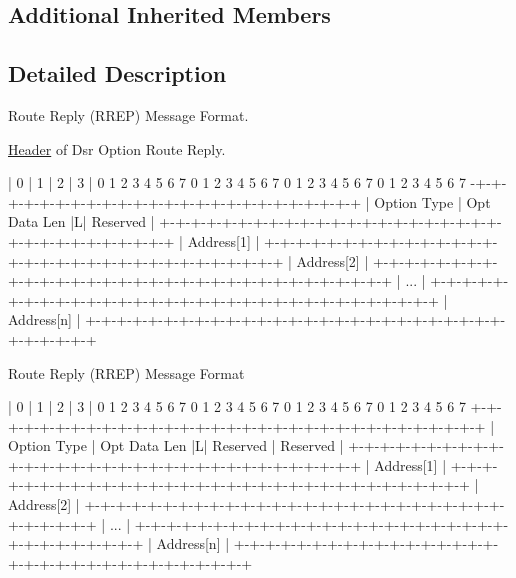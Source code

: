 \subsection*{Additional Inherited Members}


\subsection{Detailed Description}
Route Reply (R\+R\+EP) Message Format. 

\hyperlink{classns3_1_1Header}{Header} of Dsr Option Route Reply.

\begin{DoxyVerb} |      0        |      1        |      2        |      3        |
 0 1 2 3 4 5 6 7 0 1 2 3 4 5 6 7 0 1 2 3 4 5 6 7 0 1 2 3 4 5 6 7
                -+-+-+-+-+-+-+-+-+-+-+-+-+-+-+-+-+-+-+-+-+-+-+-+-+
                |  Option Type  |  Opt Data Len |L|   Reserved   |
 +-+-+-+-+-+-+-+-+-+-+-+-+-+-+-+-+-+-+-+-+-+-+-+-+-+-+-+-+-+-+-+-+
 |                            Address[1]                         |
 +-+-+-+-+-+-+-+-+-+-+-+-+-+-+-+-+-+-+-+-+-+-+-+-+-+-+-+-+-+-+-+-+
 |                            Address[2]                         |
 +-+-+-+-+-+-+-+-+-+-+-+-+-+-+-+-+-+-+-+-+-+-+-+-+-+-+-+-+-+-+-+-+
 |                               ...                             |
 +-+-+-+-+-+-+-+-+-+-+-+-+-+-+-+-+-+-+-+-+-+-+-+-+-+-+-+-+-+-+-+-+
 |                            Address[n]                         |
 +-+-+-+-+-+-+-+-+-+-+-+-+-+-+-+-+-+-+-+-+-+-+-+-+-+-+-+-+-+-+-+-+
\end{DoxyVerb}


Route Reply (R\+R\+EP) Message Format \begin{DoxyVerb} |      0        |      1        |      2        |      3        |
 0 1 2 3 4 5 6 7 0 1 2 3 4 5 6 7 0 1 2 3 4 5 6 7 0 1 2 3 4 5 6 7
 +-+-+-+-+-+-+-+-+-+-+-+-+-+-+-+-+-+-+-+-+-+-+-+-+-+-+-+-+-+-+-+-+
 |  Option Type  |  Opt Data Len |L|   Reserved   |   Reserved   |
 +-+-+-+-+-+-+-+-+-+-+-+-+-+-+-+-+-+-+-+-+-+-+-+-+-+-+-+-+-+-+-+-+
 |                            Address[1]                         |
 +-+-+-+-+-+-+-+-+-+-+-+-+-+-+-+-+-+-+-+-+-+-+-+-+-+-+-+-+-+-+-+-+
 |                            Address[2]                         |
 +-+-+-+-+-+-+-+-+-+-+-+-+-+-+-+-+-+-+-+-+-+-+-+-+-+-+-+-+-+-+-+-+
 |                               ...                             |
 +-+-+-+-+-+-+-+-+-+-+-+-+-+-+-+-+-+-+-+-+-+-+-+-+-+-+-+-+-+-+-+-+
 |                            Address[n]                         |
 +-+-+-+-+-+-+-+-+-+-+-+-+-+-+-+-+-+-+-+-+-+-+-+-+-+-+-+-+-+-+-+-+
\end{DoxyVerb}
 

